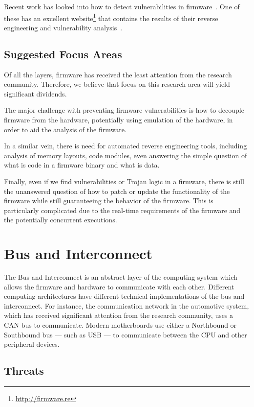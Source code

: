 \documentclass[11pt,letterpaper]{article}
\begin{document}
Recent work has looked into how to detect vulnerabilities in
firmware~\cite{Davidson2013, Costin2014, Shoshitaishvili2015}. One of
these has an excellent website\footnote{\url{http://firmware.re}}
that contains the results of their reverse engineering and
vulnerability analysis~\cite{Costin2014}.

\subsection{Suggested Focus Areas}
Of all the layers, firmware has received the least attention from the
research community. Therefore, we believe that focus on this research
area will yield significant dividends. 

The major challenge with preventing firmware vulnerabilities is how to decouple
firmware from the hardware, potentially using emulation of the
hardware, in order to aid the analysis of the firmware. 

In a similar vein, there is need for automated reverse engineering tools,
including analysis of memory layouts, code modules, even answering the
simple question of what is code in a firmware binary and what is data.

Finally, even if we find vulnerabilities or Trojan logic in a
firmware, there is still the unanswered question of how to patch or
update the functionality of the firmware while still guaranteeing the
behavior of the firmware. This is particularly complicated due to the
real-time requirements of the firmware and the potentially concurrent
executions.  

\section{Bus and Interconnect}

The Bus and Interconnect is an abstract layer of the computing system
which allows the firmware and hardware to communicate with each other.
Different computing architectures have different technical
implementations of the bus and interconnect. For instance, the
communication network in the automotive system, which has received
significant attention from the research community, uses a CAN bus to
communicate. Modern motherboards use either a Northbound or Southbound
bus --- such as USB --- to communicate between the CPU and other peripheral devices.

\subsection{Threats}
\end{document}

